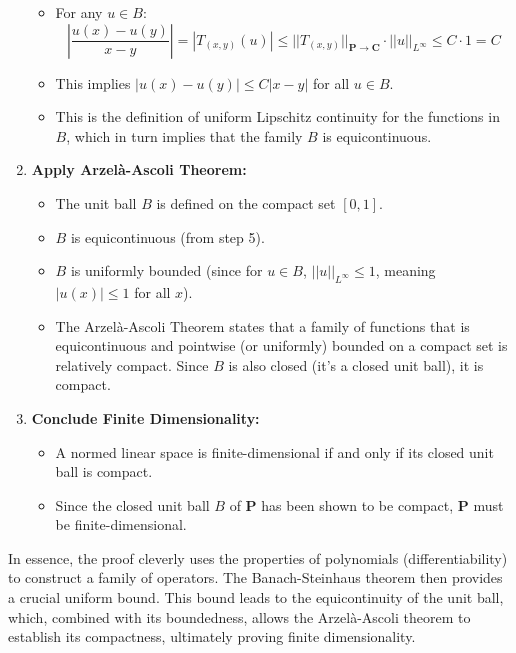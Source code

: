 \begin{enumerate}
\begin{itemize}
		\item For any $u \in B$:
\[
\left|\frac{u(x) - u(y)}{x-y}\right| = |T_{(x,y)}(u)| \le ||T_{(x,y)}||_{\mathbf{P} \to \mathbf{C}} \cdot ||u||_{L^\infty} \le C \cdot 1 = C
\]
		\item This implies $|u(x) - u(y)| \le C|x-y|$ for all $u \in B$.
		\item This is the definition of uniform Lipschitz continuity for the functions in $B$, which in turn implies that the family $B$ is equicontinuous.
	\end{itemize}
	\item \textbf{Apply Arzelà-Ascoli Theorem:}
	\begin{itemize}
		\item The unit ball $B$ is defined on the compact set $[0,1]$.
		\item $B$ is equicontinuous (from step 5).
		\item $B$ is uniformly bounded (since for $u \in B$, $||u||_{L^\infty} \le 1$, meaning $|u(x)| \le 1$ for all $x$).
		\item The Arzelà-Ascoli Theorem states that a family of functions that is equicontinuous and pointwise (or uniformly) bounded on a compact set is relatively compact. Since $B$ is also closed (it's a closed unit ball), it is compact.
	\end{itemize}
	\item \textbf{Conclude Finite Dimensionality:}
	\begin{itemize}
		\item A normed linear space is finite-dimensional if and only if its closed unit ball is compact.
		\item Since the closed unit ball $B$ of $\mathbf{P}$ has been shown to be compact, $\mathbf{P}$ must be finite-dimensional.
	\end{itemize}
\end{enumerate}

In essence, the proof cleverly uses the properties of polynomials (differentiability) to construct a family of operators. The Banach-Steinhaus theorem then provides a crucial uniform bound. This bound leads to the equicontinuity of the unit ball, which, combined with its boundedness, allows the Arzelà-Ascoli theorem to establish its compactness, ultimately proving finite dimensionality.
